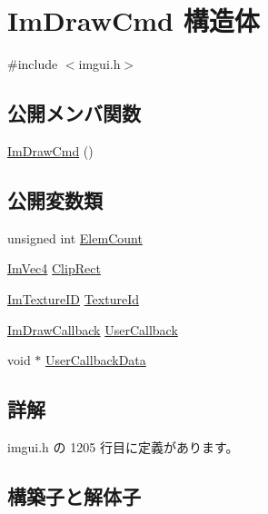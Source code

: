 \hypertarget{struct_im_draw_cmd}{}\section{Im\+Draw\+Cmd 構造体}
\label{struct_im_draw_cmd}


{\ttfamily \#include $<$imgui.\+h$>$}

\subsection*{公開メンバ関数}
\begin{DoxyCompactItemize}
\item 
\mbox{\hyperlink{struct_im_draw_cmd_adcf30cacb8e6b747e90000603c87f1e3}{Im\+Draw\+Cmd}} ()
\end{DoxyCompactItemize}
\subsection*{公開変数類}
\begin{DoxyCompactItemize}
\item 
unsigned int \mbox{\hyperlink{struct_im_draw_cmd_aafe2532964fb1f6905d67d84dd3e8730}{Elem\+Count}}
\item 
\mbox{\hyperlink{struct_im_vec4}{Im\+Vec4}} \mbox{\hyperlink{struct_im_draw_cmd_a838918f420ff81cb8dc7265077592daa}{Clip\+Rect}}
\item 
\mbox{\hyperlink{imgui_8h_a364f4447ecbc4ca176145ccff9db6286}{Im\+Texture\+ID}} \mbox{\hyperlink{struct_im_draw_cmd_a4f3b5985ece9ca6b71e7a8e7d85a82e5}{Texture\+Id}}
\item 
\mbox{\hyperlink{imgui_8h_a232a477233f9e3ab7640720bf94674de}{Im\+Draw\+Callback}} \mbox{\hyperlink{struct_im_draw_cmd_ad26dac4e939f5c4bb892cbca0f9e3af8}{User\+Callback}}
\item 
void $\ast$ \mbox{\hyperlink{struct_im_draw_cmd_ae2f5a0baf4a0b25942237b8ce6adb42d}{User\+Callback\+Data}}
\end{DoxyCompactItemize}


\subsection{詳解}


 imgui.\+h の 1205 行目に定義があります。



\subsection{構築子と解体子}
\mbox{\label{struct_im_draw_cmd_adcf30cacb8e6b747e90000603c87f1e3}} 
